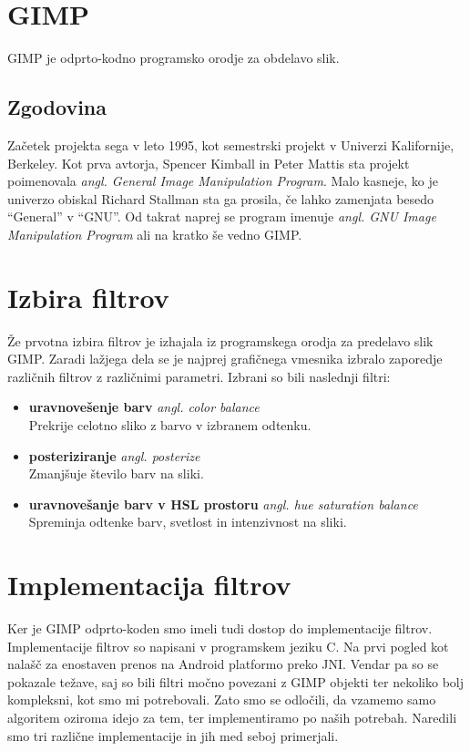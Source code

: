 \section{GIMP}
GIMP je odprto-kodno programsko orodje za obdelavo slik.

\subsection{Zgodovina}
Začetek projekta sega v leto 1995, kot semestrski projekt v Univerzi Kalifornije, Berkeley. Kot prva avtorja, Spencer Kimball in Peter Mattis sta projekt poimenovala \textit{angl. General Image Manipulation Program}. Malo kasneje, ko je univerzo obiskal Richard Stallman sta ga prosila, če lahko zamenjata besedo ``General'' v ``GNU''. Od takrat naprej se program imenuje \textit{angl. GNU Image Manipulation Program} ali na kratko še vedno GIMP.

\section{Izbira filtrov}
Že prvotna izbira filtrov je izhajala iz programskega orodja za predelavo slik GIMP. Zaradi lažjega dela se je najprej grafičnega vmesnika izbralo zaporedje različnih filtrov z različnimi parametri. Izbrani so bili naslednji filtri:
\begin{itemize}
	\item \textbf{uravnovešenje barv} \textit{angl. color balance} \hfill \\ Prekrije celotno sliko z barvo v izbranem odtenku.
	\item \textbf{posteriziranje} \textit{angl. posterize} \hfill \\ Zmanjšuje število barv na sliki.
	\item \textbf{uravnovešanje barv v HSL prostoru} \textit{angl. hue saturation balance} \hfill \\ Spreminja odtenke barv, svetlost in intenzivnost na sliki.%
\end{itemize}

\section{Implementacija filtrov}
Ker je GIMP odprto-koden smo imeli tudi dostop do implementacije filtrov. Implementacije filtrov so napisani v programskem jeziku C. Na prvi pogled kot nalašč za enostaven prenos na Android platformo preko JNI. Vendar pa so se pokazale težave, saj so bili filtri močno povezani z GIMP objekti ter nekoliko bolj kompleksni, kot smo mi potrebovali. Zato smo se odločili, da vzamemo samo algoritem oziroma idejo za tem, ter implementiramo po naših potrebah. Naredili smo tri različne implementacije in jih med seboj primerjali.

